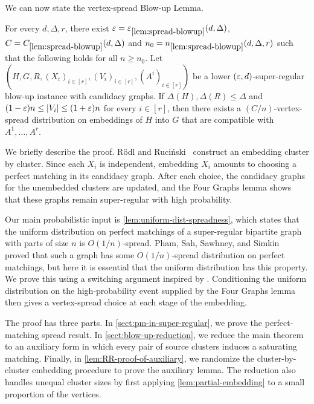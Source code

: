 \documentclass[11pt]{amsart}
\begin{document}
We can now state the vertex-spread Blow-up Lemma.

\begin{theorem}\label{lem:spread-blowup}
For every $d, \Delta, r$, there exist $\varepsilon = \varepsilon_{\ref*{lem:spread-blowup}}(d, \Delta)$, $C = C_{\ref*{lem:spread-blowup}}(d, \Delta)$ and $n_0 = n_{\ref*{lem:spread-blowup}}(d, \Delta, r)$ such that the following holds for all $n \geq n_0$.  Let $\left(H, G, R, (X_i)_{i\in [r]}, (V_i)_{i\in [r]}, (A^i)_{i \in [r]}\right)$ be a lower $(\varepsilon, d)$-super-regular blow-up instance with candidacy graphs.  If $\Delta(H), \Delta(R) \leq \Delta$ and $(1 - \varepsilon)n \leq |V_i| \leq (1 + \varepsilon)n$ for every $i \in [r]$, then there exists a $(C / n)$-vertex-spread distribution on embeddings of $H$ into $G$ that are compatible with $A^1, \dots, A^r$.
\end{theorem}

We briefly describe the proof.  R\"{o}dl and Ruci\'{n}ski~\cite{RR99}
construct an embedding cluster by cluster.  Since each $X_i$ is independent,
embedding $X_i$ amounts to choosing a perfect matching in its candidacy graph.
After each choice, the candidacy graphs for the unembedded clusters are
updated, and the Four Graphs lemma shows that these graphs remain
super-regular with high probability.

Our main probabilistic input is \cref{lem:uniform-dist-spreadness}, which states
that the uniform distribution on perfect matchings of a super-regular
bipartite graph with parts of size $n$ is $O(1/n)$-spread.  Pham, Sah,
Sawhney, and Simkin~\cite{PSSS22} proved that such a graph has some
$O(1/n)$-spread distribution on perfect matchings, but here it is essential
that the uniform distribution has this property.  We prove this using a
switching argument inspired by \cite[Theorem 4.3]{KKOT19}.  Conditioning the
uniform distribution on the high-probability event supplied by the Four
Graphs lemma then gives a vertex-spread choice at each stage of the embedding.

The proof has three parts.  In \cref{sect:pm-in-super-regular}, we prove the
perfect-matching spread result.  In \cref{sect:blow-up-reduction}, we reduce
the main theorem to an auxiliary form in which every pair of source clusters
induces a saturating matching.  Finally, in
\cref{lem:RR-proof-of-auxiliary}, we randomize the cluster-by-cluster
embedding procedure to prove the auxiliary lemma.  The reduction also handles
unequal cluster sizes by first applying \cref{lem:partial-embedding} to a small
proportion of the vertices.
\end{document}
